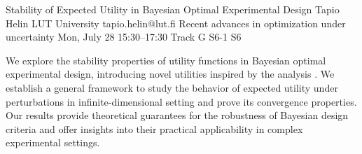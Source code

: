 \begin{talk}
  {Stability of Expected Utility in Bayesian Optimal Experimental Design}%
  {Tapio Helin}%
  {LUT University}%
  {tapio.helin@lut.fi}%
  {Recent advances in optimization under uncertainty}%
  {}%
  {Mon, July 28 15:30–17:30 Track G}%
  {S6-1}%
  {S6}%
				
			
We explore the stability properties of utility functions in Bayesian optimal experimental design, introducing novel utilities inspired by the analysis . We establish a general framework to study the behavior of expected utility under perturbations in infinite-dimensional setting and prove its convergence properties. Our results provide theoretical guarantees for the robustness of Bayesian design criteria and offer insights into their practical applicability in complex experimental settings.

\medskip

%
\end{talk}

